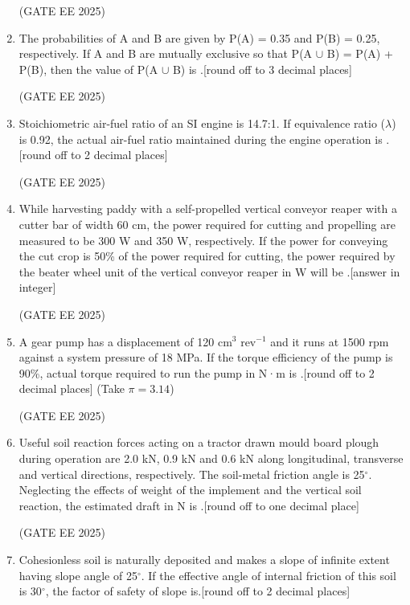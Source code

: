 \documentclass[journal,12pt,onecolumn]{IEEEtran}
\theoremstyle{remark}
\begin{document}
\begin{enumerate}
\hfill(GATE EE 2025)

\item The probabilities of A and B are given by P(A) = 0.35 and P(B) = 0.25, respectively. If A and B are mutually exclusive so that P(A $\cup$ B) = P(A) + P(B), then the value of P(A $\cup$ B) is \underline{\hspace{2cm}}.[round off to 3 decimal places]

\hfill(GATE EE 2025)

\item Stoichiometric air-fuel ratio of an SI engine is 14.7:1. If equivalence ratio ($\lambda$) is 0.92, the actual air-fuel ratio maintained during the engine operation is \underline{\hspace{2cm}}.[round off to 2 decimal places]

\hfill(GATE EE 2025)

\item While harvesting paddy with a self-propelled vertical conveyor reaper with a cutter bar of width 60 cm, the power required for cutting and propelling are measured to be 300 W and 350 W, respectively. If the power for conveying the cut crop is 50\% of the power required for cutting, the power required by the beater wheel unit of the vertical conveyor reaper in W will be \underline{\hspace{2cm}}.[answer in integer]

\hfill(GATE EE 2025)

\item A gear pump has a displacement of 120 cm$^3$ rev$^{-1}$ and it runs at 1500 rpm against a system pressure of 18 MPa. If the torque efficiency of the pump is 90\%, actual torque required to run the pump in N·m is \underline{\hspace{2cm}}.[round off to 2 decimal places]  
(Take $\pi = 3.14$)

\hfill(GATE EE 2025)

\item Useful soil reaction forces acting on a tractor drawn mould board plough during operation are 2.0 kN, 0.9 kN and 0.6 kN along longitudinal, transverse and vertical directions, respectively. The soil-metal friction angle is 25$^\circ$. Neglecting the effects of weight of the implement and the vertical soil reaction, the estimated draft in N is \underline{\hspace{2cm}}.{[round off to one decimal place]}

\hfill(GATE EE 2025)

\item Cohesionless soil is naturally deposited and makes a slope of infinite extent having slope angle of 25$^\circ$. If the effective angle of internal friction of this soil is 30$^\circ$, the factor of safety of slope is\underline{\hspace{2cm}}.{[round off to 2 decimal places]}


\end{enumerate}
\end{document}
